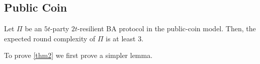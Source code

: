 
\subsection{Public Coin}
\begin{theorem}\label{thm2}
Let $\Pi$ be an $5t$-party $2t$-resilient BA protocol in the public-coin model. Then, the expected round complexity of $\Pi$ is at least $3$.
\end{theorem}

To prove \cref{thm2} we first prove a simpler lemma.

